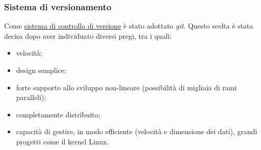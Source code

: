 \subsubsection{Sistema di versionamento}
Come \underline{sistema di controllo di versione}  è stato adottato \textit{git}. Questo scelta è stata decisa dopo aver individuato diversi pregi, tra i quali:
\begin{itemize}
\item velocità;
\item design semplice;
\item forte supporto allo sviluppo non-lineare (possibilità di migliaia di rami paralleli);
\item completamente distribuito;
\item capacità di gestire, in modo efficiente (velocità e dimensione dei dati), grandi progetti come il kernel Linux.
\end{itemize}


